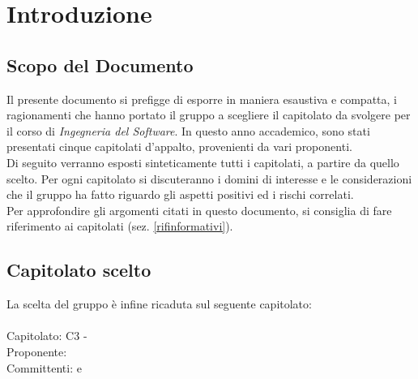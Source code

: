 \section{Introduzione}
\label{introduzione}
\subsection{Scopo del Documento}
\label{scopodocumento}
Il presente documento si prefigge di esporre in maniera esaustiva e compatta, i ragionamenti che hanno portato il gruppo \authorName{} a scegliere il capitolato da svolgere per il corso di \textit{Ingegneria del Software}. In questo anno accademico, sono stati presentati cinque capitolati d'appalto, provenienti da vari proponenti. 
\\Di seguito verranno esposti sinteticamente tutti i capitolati, a partire da quello scelto. Per ogni capitolato si discuteranno i domini di interesse e le considerazioni che il gruppo ha fatto riguardo gli aspetti positivi ed i rischi correlati. \\Per approfondire gli argomenti citati in questo documento, si consiglia di fare riferimento ai capitolati (sez. \ref{rifinformativi}).

\subsection{Capitolato scelto}
\label{capitolatoscelto}
La scelta del gruppo \authorName{} è infine ricaduta sul seguente capitolato:\\ \\
Capitolato: C3 - \project \\
Proponente: \proposerName \\
Committenti: \commitName{} e \commitNameC

